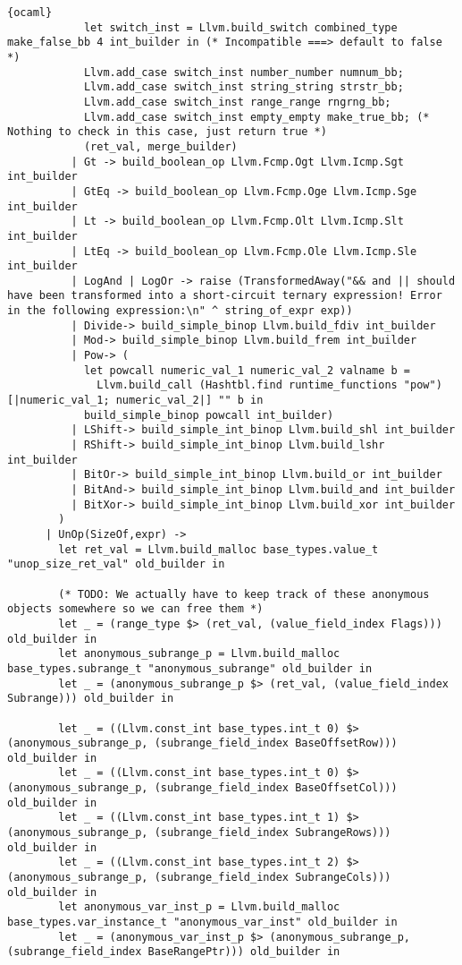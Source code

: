 \begin{lstlisting}{ocaml}
            let switch_inst = Llvm.build_switch combined_type make_false_bb 4 int_builder in (* Incompatible ===> default to false *)
            Llvm.add_case switch_inst number_number numnum_bb;
            Llvm.add_case switch_inst string_string strstr_bb;
            Llvm.add_case switch_inst range_range rngrng_bb;
            Llvm.add_case switch_inst empty_empty make_true_bb; (* Nothing to check in this case, just return true *)
            (ret_val, merge_builder)
          | Gt -> build_boolean_op Llvm.Fcmp.Ogt Llvm.Icmp.Sgt int_builder
          | GtEq -> build_boolean_op Llvm.Fcmp.Oge Llvm.Icmp.Sge int_builder
          | Lt -> build_boolean_op Llvm.Fcmp.Olt Llvm.Icmp.Slt int_builder
          | LtEq -> build_boolean_op Llvm.Fcmp.Ole Llvm.Icmp.Sle int_builder
          | LogAnd | LogOr -> raise (TransformedAway("&& and || should have been transformed into a short-circuit ternary expression! Error in the following expression:\n" ^ string_of_expr exp))
          | Divide-> build_simple_binop Llvm.build_fdiv int_builder
          | Mod-> build_simple_binop Llvm.build_frem int_builder
          | Pow-> (
            let powcall numeric_val_1 numeric_val_2 valname b =
              Llvm.build_call (Hashtbl.find runtime_functions "pow") [|numeric_val_1; numeric_val_2|] "" b in
            build_simple_binop powcall int_builder)
          | LShift-> build_simple_int_binop Llvm.build_shl int_builder
          | RShift-> build_simple_int_binop Llvm.build_lshr int_builder
          | BitOr-> build_simple_int_binop Llvm.build_or int_builder
          | BitAnd-> build_simple_int_binop Llvm.build_and int_builder
          | BitXor-> build_simple_int_binop Llvm.build_xor int_builder
        )
      | UnOp(SizeOf,expr) ->
        let ret_val = Llvm.build_malloc base_types.value_t "unop_size_ret_val" old_builder in

        (* TODO: We actually have to keep track of these anonymous objects somewhere so we can free them *)
        let _ = (range_type $> (ret_val, (value_field_index Flags))) old_builder in
        let anonymous_subrange_p = Llvm.build_malloc base_types.subrange_t "anonymous_subrange" old_builder in
        let _ = (anonymous_subrange_p $> (ret_val, (value_field_index Subrange))) old_builder in

        let _ = ((Llvm.const_int base_types.int_t 0) $> (anonymous_subrange_p, (subrange_field_index BaseOffsetRow))) old_builder in
        let _ = ((Llvm.const_int base_types.int_t 0) $> (anonymous_subrange_p, (subrange_field_index BaseOffsetCol))) old_builder in
        let _ = ((Llvm.const_int base_types.int_t 1) $> (anonymous_subrange_p, (subrange_field_index SubrangeRows))) old_builder in
        let _ = ((Llvm.const_int base_types.int_t 2) $> (anonymous_subrange_p, (subrange_field_index SubrangeCols))) old_builder in
        let anonymous_var_inst_p = Llvm.build_malloc base_types.var_instance_t "anonymous_var_inst" old_builder in
        let _ = (anonymous_var_inst_p $> (anonymous_subrange_p, (subrange_field_index BaseRangePtr))) old_builder in


\end{lstlisting}

